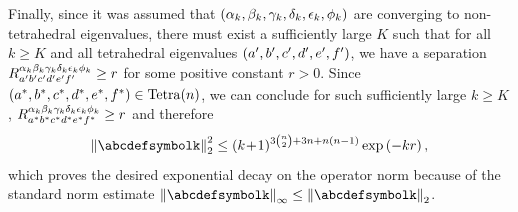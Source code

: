 \documentclass[notitlepage, 11pt, letterpaper]{amsart}
\begin{document}
Finally, since it was assumed that $(\alpha_k,\beta_k,\gamma_k,\delta_k,\epsilon_k,\phi_k)$ are converging to non-tetrahedral eigenvalues, there must exist a sufficiently large $K$ such that for all $k \geq K$ and all tetrahedral eigenvalues $(a',b',c',d',e',f')$, we have a separation $R_{a'b'c'd'e'f'}^{\alpha_k\beta_k\gamma_k\delta_k\epsilon_k\phi_k} \geq r$ for some positive constant $r > 0$.
Since $(a^{*},b^{*},c^{*},d^{*},e^{*},f^{*}) \in \operatorname{Tetra}(n)$, we can conclude for such sufficiently large $k \geq K$, $R_{a^{*}b^{*}c^{*}d^{*}e^{*}f^{*}}^{\alpha_k\beta_k\gamma_k\delta_k\epsilon_k\phi_k} \geq r$ and therefore
\begin{equation}
    \norm{\abcdefsymbolk}_{2}^{2} \leq \polyk{3\binom{n}{2}+3n + n(n-1)}  \exp\left( - k r\right),
\end{equation}
which proves the desired exponential decay on the operator norm because of the standard norm estimate $\norm{\abcdefsymbolk}_{\infty} \leq \norm{\abcdefsymbolk}_{2}$.

\end{document}
